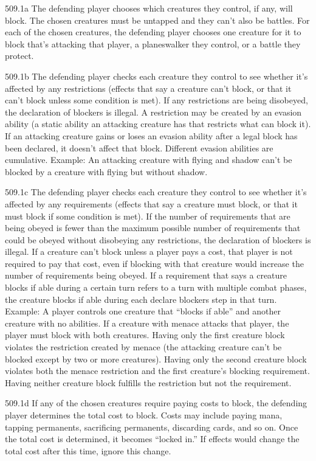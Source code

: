 509.1a The defending player chooses which creatures they control, if any, will block. The chosen creatures must be untapped and they can’t also be battles. For each of the chosen creatures, the defending player chooses one creature for it to block that’s attacking that player, a planeswalker they control, or a battle they protect.

509.1b The defending player checks each creature they control to see whether it’s affected by any restrictions (effects that say a creature can’t block, or that it can’t block unless some condition is met). If any restrictions are being disobeyed, the declaration of blockers is illegal.
A restriction may be created by an evasion ability (a static ability an attacking creature has that restricts what can block it). If an attacking creature gains or loses an evasion ability after a legal block has been declared, it doesn’t affect that block. Different evasion abilities are cumulative.
Example: An attacking creature with flying and shadow can’t be blocked by a creature with flying but without shadow.

509.1c The defending player checks each creature they control to see whether it’s affected by any requirements (effects that say a creature must block, or that it must block if some condition is met). If the number of requirements that are being obeyed is fewer than the maximum possible number of requirements that could be obeyed without disobeying any restrictions, the declaration of blockers is illegal. If a creature can’t block unless a player pays a cost, that player is not required to pay that cost, even if blocking with that creature would increase the number of requirements being obeyed. If a requirement that says a creature blocks if able during a certain turn refers to a turn with multiple combat phases, the creature blocks if able during each declare blockers step in that turn.
Example: A player controls one creature that “blocks if able” and another creature with no abilities. If a creature with menace attacks that player, the player must block with both creatures. Having only the first creature block violates the restriction created by menace (the attacking creature can’t be blocked except by two or more creatures). Having only the second creature block violates both the menace restriction and the first creature’s blocking requirement. Having neither creature block fulfills the restriction but not the requirement.

509.1d If any of the chosen creatures require paying costs to block, the defending player determines the total cost to block. Costs may include paying mana, tapping permanents, sacrificing permanents, discarding cards, and so on. Once the total cost is determined, it becomes “locked in.” If effects would change the total cost after this time, ignore this change.

